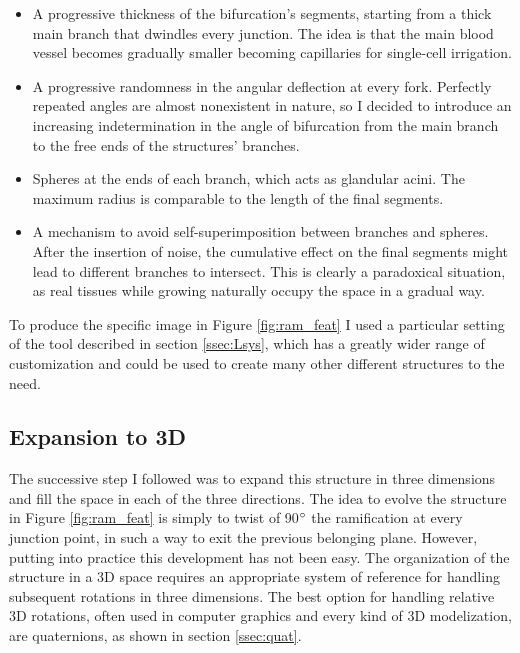     \begin{itemize}
        \item A progressive thickness of the bifurcation's segments, starting from a thick main branch that dwindles every junction. The idea is that the main blood vessel becomes gradually smaller becoming capillaries for single-cell irrigation.
        \item A progressive randomness in the angular deflection at every fork. Perfectly repeated angles are almost nonexistent in nature, so I decided to introduce an increasing indetermination in the angle of bifurcation from the main branch to the free ends of the structures' branches.
        \item Spheres at the ends of each branch, which acts as glandular acini. The maximum radius is comparable to the length of the final segments.
        \item A mechanism to avoid self-superimposition between branches and spheres. After the insertion of noise, the cumulative effect on the final segments might lead to different branches to intersect. This is clearly a paradoxical situation, as real tissues while growing naturally occupy the space in a gradual way.
    \end{itemize}

    To produce the specific image in Figure \ref{fig:ram_feat} I used a particular setting of the tool described in section \ref{ssec:Lsys}, which has a greatly wider range of customization and could be used to create many other different structures to the need.

\subsection{Expansion to 3D}
    The successive step I followed was to expand this structure in three dimensions and fill the space in each of the three directions. The idea to evolve the structure in Figure \ref{fig:ram_feat} is simply to twist of 90$\degree$ the ramification at every junction point, in such a way to exit the previous belonging plane. However, putting into practice this development has not been easy. The organization of the structure in a 3D space requires an appropriate system of reference for handling subsequent rotations in three dimensions. The best option for handling relative 3D rotations, often used in computer graphics and every kind of 3D modelization, are quaternions, as shown in section \ref{ssec:quat}.

